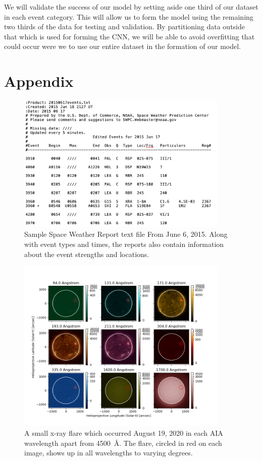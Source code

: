 \documentclass[12pt, letterpaper]{article}
\begin{document}
We will validate the success of our model by setting aside one third of our dataset in each event category. This will allow us to form the model using the remaining two thirds of the data for testing and validation. By partitioning data outside that which is used for forming the CNN, we will be able to avoid overfitting that could occur were we to use our entire dataset in the formation of our model. 





\pagebreak
\section*{Appendix}


\begin{figure}[ht]
    \includegraphics[width=0.9\textwidth]{figures/swr_sample.png}
    \centering
    \caption{Sample Space Weather Report text file From June 6, 2015. Along with event types and times, the reports also contain information about the event strengths and locations.}
    \label{swr_sample}
\end{figure}

\begin{figure}[ht]
	\includegraphics[width=0.9\textwidth]{figures/0819_flare_labeled.png}
	\centering
	\caption{A small x-ray flare which occurred August 19, 2020 in each AIA wavelength apart from 4500~\AA{}. The flare, circled in red on each image, shows up in all wavelengths to varying degrees.}
	\label{flare}
\end{figure}
\end{document}
